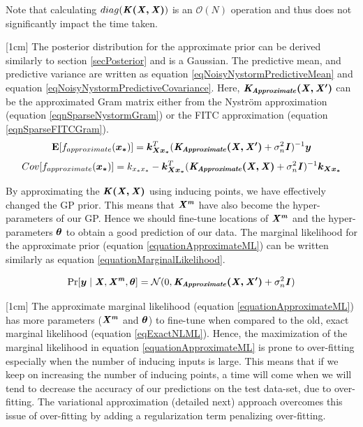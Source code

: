Note that calculating $diag(\bm{\mathit{K(X, X)}})$ is an $\mathcal{O}\left ( N \right )$ operation and thus does not significantly impact the time taken. 

[1cm]
The posterior distribution for the approximate prior can be derived similarly to section \ref{secPosterior} \cite{williams2001using} and is a Gaussian. The predictive mean, and predictive variance are written as equation \ref{eqNoisyNystormPredictiveMean} and equation \ref{eqNoisyNystormPredictiveCovariance}. Here, $\bm{\mathit{K_{Approximate}(X, X')}}$ can be the approximated Gram matrix either from the Nystr\"{o}m approximation (equation \ref{eqnSparseNystormGram}) or the FITC approximation (equation \ref{eqnSparseFITCGram}). 
\begin{equation}\label{eqNoisyNystormPredictiveMean}
  \mathbf{E}[f_{approximate}(\boldsymbol{x_{*}})] = \boldsymbol{k_{Xx_{*}}}^{T}( \bm{\mathit{K_{Approximate}(X, X')}} + \sigma^{2}_{n}\bm{\mathit{I}})^{-1} \boldsymbol{y}
  \end{equation}
\begin{equation}\label{eqNoisyNystormPredictiveCovariance}
	Cov[f_{approximate}(\boldsymbol{x_{*}})] = k_{x_{*}x_{*}} - \boldsymbol{k_{Xx_{*}}}^{T}( \bm{\mathit{K_{Approximate}(X, X)}} + \sigma^{2}_{n}\bm{\mathit{I}} )^{-1} \boldsymbol{k_{Xx_{*}}}
  \end{equation}


By approximating the $\bm{\mathit{K(X, X)}}$ using inducing points, we have effectively changed the GP prior. This means that $\bm{\mathit{X^{m}}}$ have also become the hyper-parameters of our GP. Hence we should fine-tune locations of $\bm{\mathit{X^{m}}}$ and the hyper-parameters $\boldsymbol{\theta}$ to obtain a good prediction of our data. The marginal likelihood for the approximate prior (equation \ref{equationApproximateML}) can be written similarly as equation \ref{equationMarginalLikelihood}.

\begin{equation}\label{equationApproximateML}
    \Pr[\boldsymbol{y} \mid \bm{\mathit{X}}, \bm{\mathit{X^{m}}}, \boldsymbol{\theta}] = \mathcal{N}(0 , \bm{\mathit{K_{Approximate}(X, X')}} + \sigma^{2}_{n}\bm{\mathit{I}})
\end{equation}

[1cm]
The approximate marginal likelihood (equation \ref{equationApproximateML}) has more parameters ($\bm{\mathit{X^{m}}}$ and $\boldsymbol{\theta}$) to fine-tune when compared to the old, exact marginal likelihood (equation \ref{eqExactNLML}). Hence, the maximization of the marginal likelihood in equation \ref{equationApproximateML} is prone to over-fitting especially when the number of inducing inputs is large. This means that if we keep on increasing the number of inducing points, a time will come when we will tend to decrease the accuracy of our predictions on the test data-set, due to over-fitting. The variational approximation (detailed next) approach overcomes this issue of over-fitting by adding a regularization term penalizing over-fitting.

